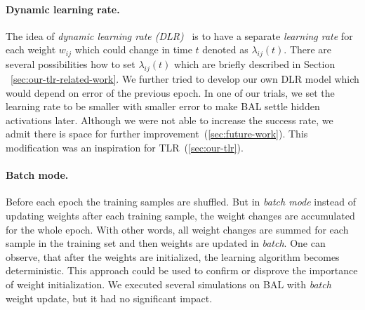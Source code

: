 \paragraph{Dynamic learning rate.} 
\label{sec:our-dynamic-lambda} 
The idea of \emph{dynamic learning rate (DLR)}~\citep{jacobs1988increased} is to have a separate \emph{learning rate} for each weight $w_{ij}$ which could change in time $t$ denoted as $\lambda_{ij}(t)$. There are several possibilities how to set $\lambda_{ij}(t)$ which are briefly described in Section ~\ref{sec:our-tlr-related-work}. We further tried to develop our own DLR model which would depend on error of the previous epoch. In one of our trials, we set the learning rate to be smaller with smaller error to make BAL settle hidden activations later. Although we were not able to increase the success rate, we admit there is space for further improvement~(\ref{sec:future-work}). This modification was an inspiration for TLR~(\ref{sec:our-tlr}). 

\paragraph{Batch mode.} 
\label{sec:our-batch-mode}
Before each epoch the training samples are shuffled. But in \emph{batch mode} instead of updating weights after each training sample, the weight changes are accumulated for the whole epoch. With other words, all weight changes are summed for each sample in the training set and then weights are updated in \emph{batch}. One can observe, that after the weights are initialized, the learning algorithm becomes deterministic. This approach could be used to confirm or disprove the importance of weight initialization. We executed several simulations on BAL with \emph{batch} weight update, but it had no significant impact. 



